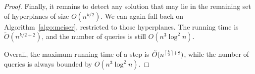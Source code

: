 \begin{proof}
Finally, it remains to detect any solution that may lie in the remaining
set of hyperplanes of size $O(n^{k/2})$. We can again fall back
on Algorithm~\ref{algo:meiser}, restricted to those hyperplanes. The running
time is $\tilde{O}(n^{k/2 + 2})$, and the number of queries is still
$O(n^3 \log^2 n)$.

Overall, the maximum running time of a step is $\tilde{O}(n^{\lceil\frac{k}{2}\rceil + 8})$,
while the number of queries is always bounded by $O(n^3\log^2 n)$.

\end{proof}


